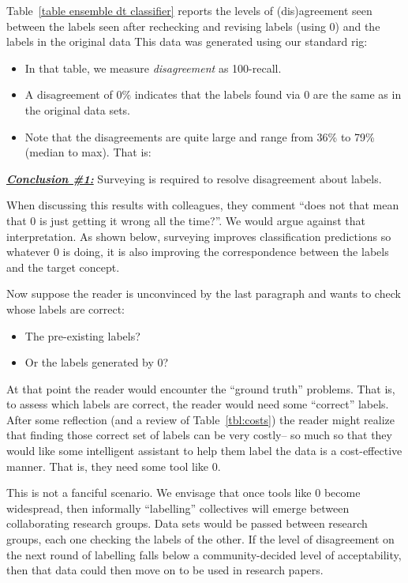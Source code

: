 \documentclass[10pt,conference]{IEEEtran}
\newcommand{\bi}{\begin{itemize}}
\newcommand{\ei}{\end{itemize}}
\newenvironment{result}[2]
{\begin{myshadowbox}\textbf{\textit{\underline{Conclusion \##1:}}} #2}{ 
\end{myshadowbox}}
\begin{document}
Table~\ref{table ensemble dt classifier} reports the levels of (dis)agreement 
seen between the labels seen after rechecking and revising
labels (using {\IT}0) and the labels in the original data
This data was generated using our standard rig:
\bi
\item
In that table, we measure {\em disagreement}
as 100-recall.
\item
A   disagreement of 0\% indicates that the labels found via {\IT}0 are the same as in the original
data sets. 
\item
Note that the disagreements are quite large and range from 36\% to 79\% (median to max). That is: 
\ei
\begin{result}{1}
Surveying is required to resolve
 disagreement about labels.
\end{result}
When discussing this results with colleagues, they comment ``does
not that mean that {\IT}0 is just getting it wrong all the time?''.
We would argue against that interpretation. As shown below,
surveying improves
classification predictions  so whatever {\IT}0 is doing,
it is also improving the correspondence between the labels and the target concept.

Now suppose the reader is unconvinced by the last paragraph and wants to check whose labels are correct:
\bi
\item
The pre-existing labels?
\item
Or the labels generated by {\IT}0?
\ei
At that point the reader would
encounter the ``ground truth'' problems. That is, to assess
which labels are correct, the reader would need some ``correct'' labels. After some reflection (and a review of Table~\ref{tbl:costs}) the reader might realize that finding  those correct
set of labels can be very costly-- so much so that they would like some intelligent
assistant to help them label the data is a cost-effective manner. That is, they need
some tool like {\IT}0.

This is not a fanciful scenario. We envisage that once tools like {\IT}0 become
widespread, then informally ``labelling'' collectives will emerge between  collaborating 
research groups. Data sets would be passed between research groups, each one checking the labels
of the other. If the level  of disagreement on the next round of labelling
falls below a community-decided level of acceptability, then that data could then
move on to be used in research papers.


\end{document}
